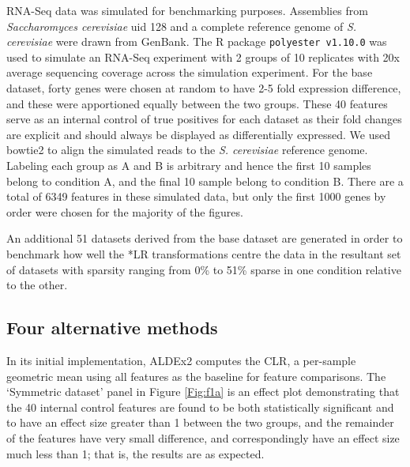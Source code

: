 \documentclass{bmcart}
\begin{document}
RNA-Seq data was simulated for benchmarking purposes. Assemblies from \textit{Saccharomyces cerevisiae} uid 128 and  a complete reference genome of \textit{S. cerevisiae} were drawn from GenBank. The R package \texttt{polyester v1.10.0} \cite{polyester:2016} was used to simulate an RNA-Seq experiment with 2 groups of 10 replicates with 20x average sequencing coverage across the simulation experiment. For the base dataset, forty genes were chosen at random to have 2-5 fold expression difference, and these were apportioned equally between the two groups. These 40 features serve as an internal control of true positives for each dataset as their fold changes are explicit and should always be displayed as differentially expressed. We used bowtie2 \cite{bowtie2} to align the simulated reads  to the \textit{S. cerevisiae} reference genome. Labeling each group as A and B is arbitrary and hence the first 10 samples belong to condition A, and the final 10 sample belong to condition B. There are a total of 6349 features in these simulated data, but only the first 1000 genes by order were chosen for the majority of the figures. 

An additional 51 datasets derived from the base dataset are generated in order to benchmark how well the *LR transformations centre the data in the resultant set of datasets with sparsity ranging from 0\% to 51\% sparse in one condition relative to the other. 


\subsection*{Four alternative methods}


In its initial implementation, ALDEx2 computes the CLR, a per-sample geometric mean using all features as the baseline for feature comparisons. The `Symmetric dataset' panel in Figure \ref{Fig:f1a} is an effect plot demonstrating that the 40 internal control features are found to be both statistically significant and to have an effect size greater than 1 between the two groups, and the remainder of the features have very small difference, and correspondingly have an effect size much less than 1; that is, the results are as expected. 
\end{document}

